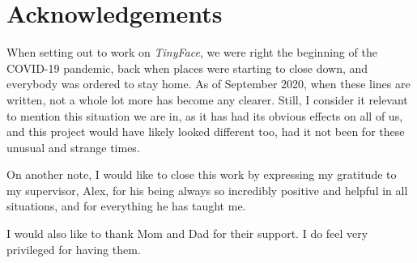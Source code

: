 
\chapter*{Acknowledgements}
When setting out to work on \textit{TinyFace}, we were right the beginning of the COVID-19 pandemic, back when places were starting to close down, and everybody was ordered to stay home. As of September 2020, when these lines are written, not a whole lot more has become any clearer. Still, I consider it relevant to mention this situation we are in, as it has had its obvious effects on all of us, and this project would have likely looked different too, had it not been for these unusual and strange times. \par
On another note, I would like to close this work by expressing my gratitude to my supervisor, Alex, for his being always so incredibly positive and helpful in all situations, and for everything he has taught me. \par
I would also like to thank Mom and Dad for their support. I do feel very privileged for having them.